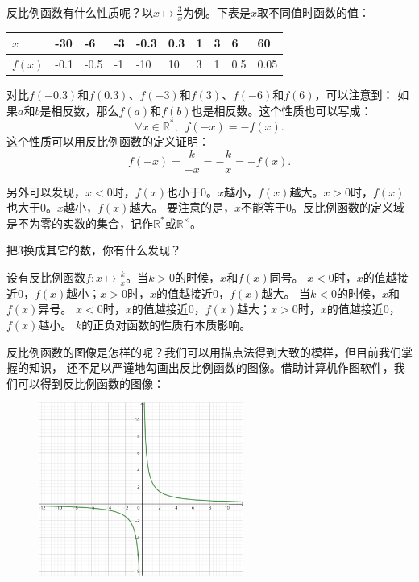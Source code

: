 \documentclass[12pt,UTF8]{ctexbook}
\begin{document}
反比例函数有什么性质呢？以$x \mapsto \frac{3}{x}$为例。下表是$x$取不同值时函数的值：

\begin{center}
    \begin{tabular}{| p{2em}<{\centering} | p{1.8em}<{\centering} | p{1.8em}<{\centering} | p{1.8em}<{\centering} | p{1.8em}<{\centering} | p{1.8em}<{\centering} | p{1.8em}<{\centering} | p{1.8em}<{\centering} | p{1.8em}<{\centering} | p{1.8em}<{\centering} |}
        \hline
        $x$ & -30 & -6 & -3 & -0.3 & 0.3 & 1 & 3 & 6 & 60 \\ [0.5ex] 
        \hline
        $f(x)$ & -0.1 & -0.5 & -1 & -10 & 10 & 3 & 1 & 0.5 & 0.05 \\   
        \hline
    \end{tabular}
\end{center}

对比$f(-0.3)$和$f(0.3)$、$f(-3)$和$f(3)$、$f(-6)$和$f(6)$，可以注意到：
如果$a$和$b$是相反数，那么$f(a)$和$f(b)$也是相反数。这个性质也可以写成：
$$ \forall x\in \mathbb{R}^*, \,\,\, f(-x) = -f(x).$$
这个性质可以用反比例函数的定义证明：
$$f(-x) = \frac{k}{-x} = -\frac{k}{x} = -f(x).$$

另外可以发现，$x<0$时，$f(x)$也小于$0$。$x$越小，$f(x)$越大。$x>0$时，$f(x)$也大于$0$。$x$越小，$f(x)$越大。
要注意的是，$x$不能等于$0$。反比例函数的定义域是不为零的实数的集合，记作$\mathbb{R}^*$或$\mathbb{R}^\times$。

把$3$换成其它的数，你有什么发现？

设有反比例函数$f: x \mapsto \frac{k}{x}$。当$k>0$的时候，$x$和$f(x)$同号。
$x<0$时，$x$的值越接近$0$，$f(x)$越小；$x>0$时，$x$的值越接近$0$，$f(x)$越大。
当$k<0$的时候，$x$和$f(x)$异号。
$x<0$时，$x$的值越接近$0$，$f(x)$越大；$x>0$时，$x$的值越接近$0$，$f(x)$越小。
$k$的正负对函数的性质有本质影响。

反比例函数的图像是怎样的呢？我们可以用描点法得到大致的模样，但目前我们掌握的知识，
还不足以严谨地勾画出反比例函数的图像。借助计算机作图软件，我们可以得到反比例函数的图像：

\begin{figure} %
    \vspace{-20pt}
    \flushright
    \includegraphics[width=0.6\textwidth]{反比例函数1.png}
\end{figure}
\end{document}
